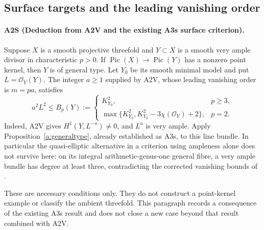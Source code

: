 \subsection{Surface targets and the leading vanishing order}
\paragraph{A2S (Deduction from A2V and the existing A3s surface criterion).}
Suppose $X$ is a smooth projective threefold and $Y\subset X$ is a
smooth very ample divisor in characteristic $p>0$. If
$\operatorname{Pic}(X)\to\operatorname{Pic}(Y)$ has a nonzero point
kernel, then $Y$ is of general type. Let $Y_0$ be its smooth minimal
model and put $L=\mathcal O_Y(Y)$. The integer $a\geq1$ supplied by
A2V, whose leading vanishing order is $m=pa$, satisfies
\[
 a^2L^2\leq B_p(Y):=
 \begin{cases}
 K_{Y_0}^2,&p\geq3,\\
 \max\{K_{Y_0}^2,K_{Y_0}^2-3\chi(\mathcal O_Y)+2\},&p=2.
 \end{cases}
\]
Indeed, A2V gives $H^1(Y,L^{-a})\ne0$, and $L^a$ is very ample.
Apply Proposition~\ref{a:generaltype}, already established as A3s,
to this line bundle. In particular the quasi-elliptic alternative
in a criterion using ampleness alone does not survive here: on its
integral arithmetic-genus-one general fibre, a very ample bundle
has degree at least three, contradicting the corrected vanishing
bounds of \cite[Theorem 3.1, pp.~4--5]{Zhang2022}.

These are necessary conditions only. They do not construct a
point-kernel example or classify the ambient threefold. This paragraph
records a consequence of the existing A3s result and does not close a
new case beyond that result combined with A2V.
